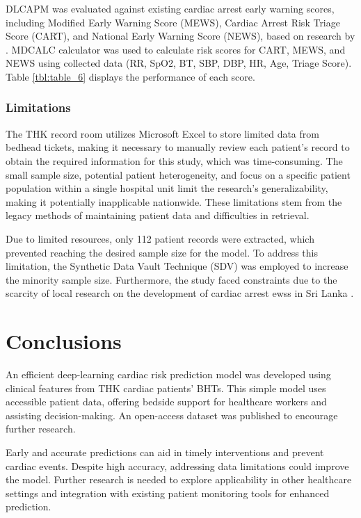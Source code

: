 \documentclass[journal,article,submit,pdftex,moreauthors]{Definitions/mdpi}
\begin{document}
DLCAPM was evaluated against existing cardiac arrest early warning scores, including Modified Early Warning Score (MEWS), Cardiac Arrest Risk Triage Score (CART), and National Early Warning Score (NEWS), based on research by \cite{b26, b27}. MDCALC calculator \cite{b28, b29, b30} was used to calculate risk scores for CART, MEWS, and NEWS using collected data (RR, SpO2, BT, SBP, DBP, HR, Age, Triage Score). Table \ref{tbl:table_6} displays the performance of each score.



\subsubsection{Limitations}

The THK record room utilizes Microsoft Excel to store limited data from bedhead tickets, making it necessary to manually review each patient's record to obtain the required information for this study, which was time-consuming. The small sample size, potential patient heterogeneity, and focus on a specific patient population within a single hospital unit limit the research's generalizability, making it potentially inapplicable nationwide. These limitations stem from the legacy methods of maintaining patient data and difficulties in retrieval.

Due to limited resources, only 112 patient records were extracted, which prevented reaching the desired sample size for the model. To address this limitation, the Synthetic Data Vault Technique (SDV) was employed to increase the minority sample size. Furthermore, the study faced constraints due to the scarcity of local research on the development of cardiac arrest \glspl{ews} in Sri Lanka \cite{b8, b10}.

\section{Conclusions}

An efficient deep-learning cardiac risk prediction model was developed using clinical features from THK cardiac patients' BHTs. This simple model uses accessible patient data, offering bedside support for healthcare workers and assisting decision-making. An open-access dataset was published to encourage further research.

Early and accurate predictions can aid in timely interventions and prevent cardiac events. Despite high accuracy, addressing data limitations could improve the model. Further research is needed to explore applicability in other healthcare settings and integration with existing patient monitoring tools for enhanced prediction.
\end{document}
